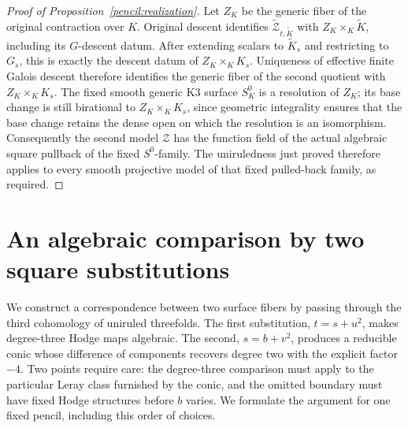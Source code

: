 \documentclass[11pt]{amsart}
\theoremstyle{definition}
\theoremstyle{remark}
\numberwithin{equation}{section}
\begin{document}
\begin{proof}[Proof of Proposition~\ref{pencil:realization}]
Let \(Z_K\) be the generic fiber of the original contraction over
\(K\).  Original descent identifies
\(\widetilde{\mathcal Z}_{t,\widetilde K}\) with \(Z_K\times_K\widetilde K\), including
its \(G\)-descent datum.  After extending scalars to \(\widetilde K_s\) and
restricting to \(G_s\), this is exactly the descent datum of
\(Z_K\times_K K_s\).  Uniqueness of effective finite Galois descent
therefore identifies the generic fiber of the second quotient with
\(Z_K\times_K K_s\).  The fixed smooth generic K3 surface \(S^0_K\)
is a resolution of \(Z_K\); its base change is still birational to
\(Z_K\times_K K_s\), since geometric integrality ensures that the
base change retains the dense open on which the resolution is an isomorphism.
Consequently the second model \(\mathcal Z\) has the function field
of the actual algebraic square pullback of the fixed \(S^0\)-family.
The uniruledness just proved therefore applies to every smooth
projective model of that fixed pulled-back family, as required.
\end{proof}
\section{An algebraic comparison by two square substitutions}
\label{comp:section}

We construct a correspondence between two surface fibers by passing
through the third cohomology of uniruled threefolds.  The first
substitution, $t=s+u^2$, makes degree-three Hodge maps algebraic.  The
second, $s=b+v^2$, produces a reducible conic whose difference of
components recovers degree two with the explicit factor $-4$.
Two points require care: the degree-three comparison must apply to the
particular Leray class furnished by the conic, and the omitted boundary
must have fixed Hodge structures before $b$ varies.  We formulate the
argument for one fixed pencil, including this order of choices.
\end{document}
